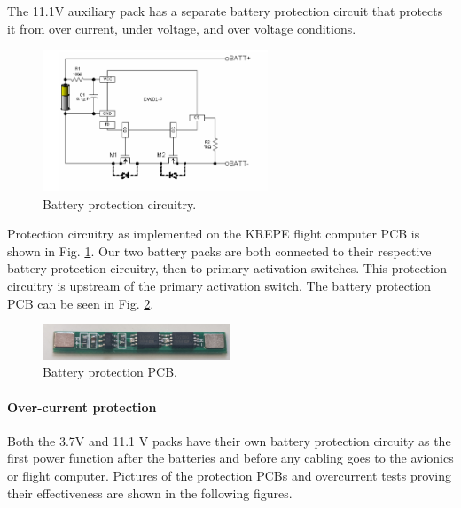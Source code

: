 \documentclass{article}
\begin{document}
The 11.1V auxiliary pack has a separate battery protection circuit that protects it from over current, under voltage, and over voltage conditions.


\begin{figure}[H]
	\centering
	\includegraphics[width=0.6\textwidth]{images/dw108.png}
	\caption{Battery protection circuitry.}
	\label{fig:bat-protec}
\end{figure}



Protection circuitry as implemented on the KREPE flight computer PCB is shown in Fig. \ref{fig:bat-protec}. Our two battery packs are both connected to their respective battery protection circuitry, then  to primary activation switches. This protection circuitry is upstream of the primary activation switch. The battery protection PCB can be seen in Fig. \ref{fig:bat-protect}.



\begin{figure}[H]
	\centering
	\includegraphics[width=0.5\textwidth]{images/new_batt_prot.png}
	\caption{Battery protection PCB.}
	\label{fig:bat-protect}
\end{figure}


\paragraph{Over-current protection}
Both the 3.7V and 11.1 V packs have their own battery protection circuity as the first power function after the batteries and before any cabling goes to the avionics or flight computer. Pictures of the protection PCBs and overcurrent tests proving their effectiveness are shown in the following figures.
\end{document}
